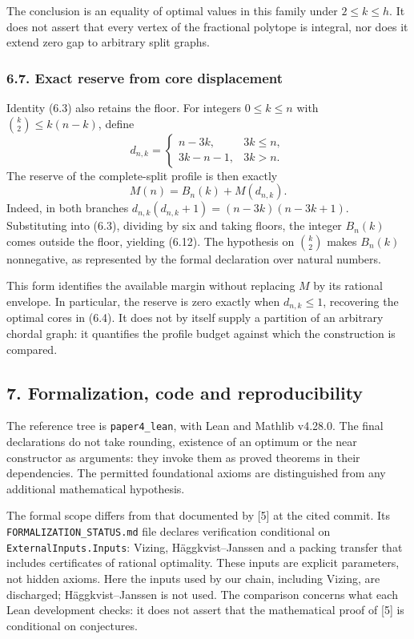 \documentclass[english,11pt,a4paper]{article}
\begin{document}
The conclusion is an equality of optimal values in this family under \(2\le k\le h\). It does not assert that every vertex of the fractional polytope is integral, nor does it extend zero gap to arbitrary split graphs.

\subsubsection{6.7. Exact reserve from core displacement}\label{exact-reserve-from-core-displacement}

Identity (6.3) also retains the floor. For integers \(0\le k\le n\) with \(\binom k2\le k(n-k)\), define \[
d_{n,k}=\begin{cases}n-3k,&3k\le n,\\3k-n-1,&3k>n.\end{cases}
\] The reserve of the complete-split profile is then exactly \[
M(n)=B_n(k)+M(d_{n,k}).
\tag{6.12}
\] Indeed, in both branches \(d_{n,k}(d_{n,k}+1)=(n-3k)(n-3k+1)\). Substituting into (6.3), dividing by six and taking floors, the integer \(B_n(k)\) comes outside the floor, yielding (6.12). The hypothesis on \(\binom k2\) makes \(B_n(k)\) nonnegative, as represented by the formal declaration over natural numbers.

This form identifies the available margin without replacing \(M\) by its rational envelope. In particular, the reserve is zero exactly when \(d_{n,k}\le1\), recovering the optimal cores in (6.4). It does not by itself supply a partition of an arbitrary chordal graph: it quantifies the profile budget against which the construction is compared.

\subsection{7. Formalization, code and reproducibility}\label{formalization-code-and-reproducibility}

The reference tree is \nolinkurl{paper4_lean}, with Lean and Mathlib v4.28.0. The final declarations do not take rounding, existence of an optimum or the near constructor as arguments: they invoke them as proved theorems in their dependencies. The permitted foundational axioms are distinguished from any additional mathematical hypothesis.

The formal scope differs from that documented by {[}5{]} at the cited commit. Its \nolinkurl{FORMALIZATION_STATUS.md} file declares verification conditional on \nolinkurl{ExternalInputs.Inputs}: Vizing, Häggkvist--Janssen and a packing transfer that includes certificates of rational optimality. These inputs are explicit parameters, not hidden axioms. Here the inputs used by our chain, including Vizing, are discharged; Häggkvist--Janssen is not used. The comparison concerns what each Lean development checks: it does not assert that the mathematical proof of {[}5{]} is conditional on conjectures.
\end{document}

